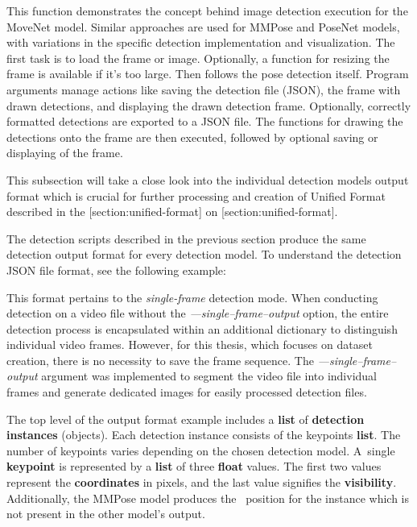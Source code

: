 
This function demonstrates the concept behind image detection execution for the MoveNet model. Similar approaches are used for MMPose and PoseNet models, with variations in the specific detection implementation and visualization. The first task is to load the frame or image. Optionally, a function for resizing the frame is available if it's too large. Then follows the pose detection itself. Program arguments manage actions like saving the detection file (JSON), the frame with drawn detections, and displaying the drawn detection frame. Optionally, correctly formatted detections are exported to a JSON file. The functions for drawing the detections onto the frame are then executed, followed by optional saving or displaying of the frame.

This subsection will take a close look into the individual detection models output format which is crucial for further processing and creation of Unified Format described in the [section:unified-format] on [section:unified-format].

The detection scripts described in the previous section produce the same detection output format for every detection model. To understand the detection JSON file format, see the following example:


This format pertains to the {\em single-frame} detection mode. When conducting detection on a video file without the {\em ---single--frame--output} option, the entire detection process is encapsulated within an additional dictionary to distinguish individual video frames. However, for this thesis, which focuses on dataset creation, there is no necessity to save the frame sequence. The {\em---single--frame--output} argument was implemented to segment the video file into individual frames and generate dedicated images for easily processed detection files.

The top level of the output format example includes a {\bf list} of {\bf detection instances} (objects). Each detection instance consists of the keypoints {\bf list}. The number of keypoints varies depending on the chosen detection model. A~single {\bf keypoint} is represented by a {\bf list} of three {\bf float} values. The first two values represent the {\bf coordinates} in pixels, and the last value signifies the {\bf visibility}. Additionally, the MMPose model produces the \BBOX\ position for the instance which is not present in the other model's output.

